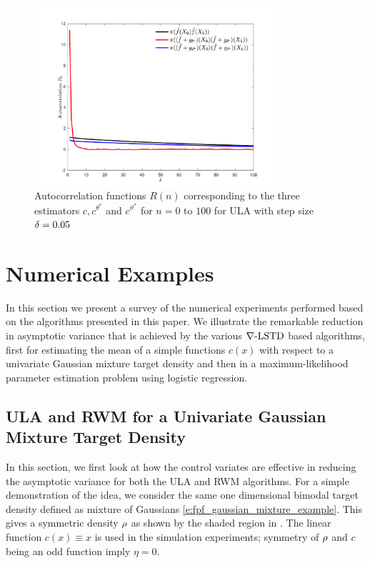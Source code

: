 \begin{figure}[htbp]
	\centering
	\includegraphics[width=3.5in]{images/Chap5_cov_R_n_gamma_pt05}
	\caption{ Autocorrelation functions $R(n)$ corresponding to the three estimators $c, c^{\theta^*}$ and $c^{\vartheta^*}$  for $n= 0$ to $100$ for ULA with step size $\delta = 0.05$}
	\label{fig:mcmc_auto_correlation}
\end{figure}

\section{Numerical Examples}
\label{s:mcmc_numerics}
In this section we present a survey of the numerical experiments performed based on the algorithms presented in this paper. We illustrate the remarkable reduction in asymptotic variance that is achieved by the various $\nabla\text{-LSTD}$ based algorithms, first for estimating the mean of a simple functions $c(x)$ with respect to a univariate Gaussian mixture target density and then in a maximum-likelihood parameter estimation problem using logistic regression.   

\subsection{ULA and RWM for a Univariate Gaussian Mixture Target Density}
\label{s:mcmc_ex_avar}
In this section, we first look at how the control variates are effective in reducing the asymptotic variance for both the ULA and RWM algorithms.  For a simple demonstration of the idea, we consider the same one dimensional bimodal target density defined as mixture of Gaussians \eqref{e:fpf_gaussian_mixture_example}. This gives a symmetric density $\rho$ as shown by the shaded region in . The linear function $c(x) \equiv x$ is used in the simulation experiments; symmetry of $\rho$ and $c$ being an odd function imply $\eta = 0$.

